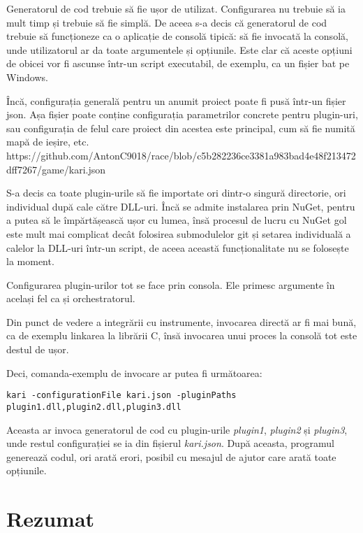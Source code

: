 \documentclass[a4paper,12pt]{report}
\begin{document}
Generatorul de cod trebuie să fie ușor de utilizat.
Configurarea nu trebuie să ia mult timp și trebuie să fie simplă.
De aceea s-a decis că generatorul de cod trebuie să funcționeze ca o aplicație de consolă tipică: să fie invocată la consolă, unde utilizatorul ar da toate argumentele și opțiunile.
Este clar că aceste opțiuni de obicei vor fi ascunse într-un script executabil, de exemplu, ca un fișier bat pe Windows.

Încă, configurația generală pentru un anumit proiect poate fi pusă într-un fișier json.
Așa fișier poate conține configurația parametrilor concrete pentru plugin-uri, sau configurația de felul care proiect din acestea este principal, cum să fie numită mapă de ieșire, etc.
https://github.com/AntonC9018/race/blob/c5b282236ce3381a983bad4e48f213472dff7267/game/kari.json


S-a decis ca toate plugin-urile să fie importate ori dintr-o singură directorie, ori individual după cale către \ac{DLL}-uri.
Încă se admite instalarea prin NuGet, pentru a putea să le împărtășească ușor cu lumea, însă procesul de lucru cu NuGet gol este mult mai complicat decât folosirea submodulelor git și setarea individuală a calelor la \ac{DLL}-uri într-un script, de aceea această funcționalitate nu se folosește la moment.

Configurarea plugin-urilor tot se face prin consola.
Ele primesc argumente în același fel ca și orchestratorul.

Din punct de vedere a integrării cu instrumente, invocarea directă ar fi mai bună, ca de exemplu linkarea la librării C, însă invocarea unui proces la consolă tot este destul de ușor.

Deci, comanda-exemplu de invocare ar putea fi următoarea:

\begin{verbatim}
kari -configurationFile kari.json -pluginPaths plugin1.dll,plugin2.dll,plugin3.dll
\end{verbatim}

Aceasta ar invoca generatorul de cod cu plugin-urile \textit{plugin1}, \textit{plugin2} și \textit{plugin3}, unde restul configurației se ia din fișierul \textit{kari{.}json}.
După aceasta, programul generează codul, ori arată erori, posibil cu mesajul de ajutor care arată toate opțiunile.


\section{Rezumat}
\end{document}
